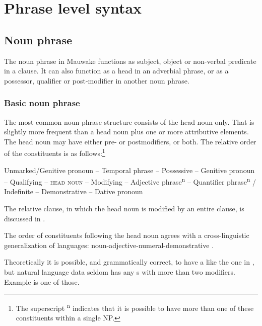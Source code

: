 
\chapter{Phrase level syntax}
{}
\section{Noun phrase}\label{sec:4.1}
{}
The noun phrase in Mauwake functions as subject, object or non-verbal predicate in a clause. It can also function as a head in an adverbial phrase, or as a possessor, qualifier or post-modifier in another noun phrase.

\subsection{Basic noun phrase} \label{sec:4.1.1}
{}
The most common noun phrase structure consists of the head noun only. That is slightly more frequent than a head noun plus one or more attributive elements. The head noun may have either pre- or postmodifiers, or both. The relative order of the  constituents is as follows:\footnote{The superscript \textsuperscript{n} indicates that it is possible to have more than one of these constituents within a single NP.}

\ea
\upshape Unmarked/Genitive pronoun -- Temporal phrase -- Possessive  -- Genitive pronoun -- Qualifying  -- \textsc{head} \textsc{noun} -- Modifying  -- Adjective phrase\textsuperscript{n} -- Quantifier phrase\textsuperscript{n} / Indefinite -- Demonstrative -- Dative pronoun
\z

The relative clause, in which the head noun is modified by an entire clause, is discussed in .

The order of  constituents following the head noun agrees with a cross-linguistic generalization of  languages:  noun-adjective-numeral-demonstrative \citep[112]{Dryer2007a}.

Theoretically it is possible, and grammatically correct, to have a  like the one in , but natural language data seldom has any s with more than two modifiers. Example  is one of those.
 

